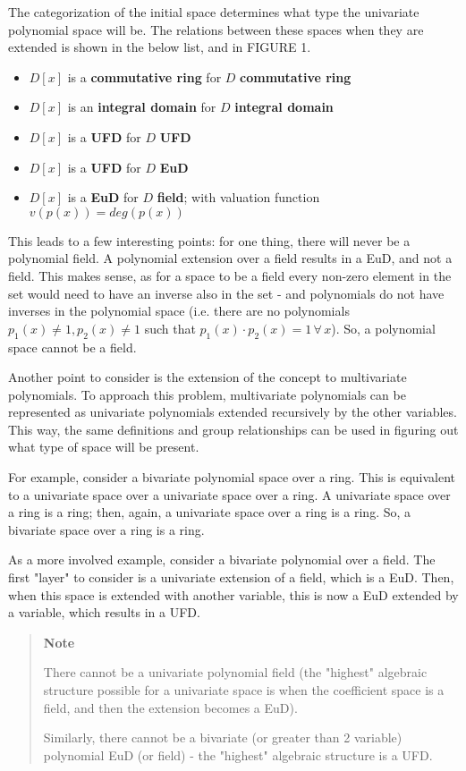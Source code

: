 \documentclass[letterpaper,12pt,titlepage,oneside,final]{book}
\newcounter{notecounter}
\newenvironment{note}{\begin{quote}%
    \refstepcounter{notecounter}%
  \textbf{Note \arabic{notecounter}}%
  \quad
}{%
\end{quote}%
}
\begin{document}
The categorization of the initial space determines what type the univariate polynomial space will be.  The relations between these spaces when they are extended is shown in the below list, and in FIGURE 1.
\begin{itemize}
	\item ${D[x]}$ is a \textbf{commutative ring} for ${D}$ \textbf{commutative ring} 
	\item ${D[x]}$ is an \textbf{integral domain} for ${D}$ \textbf{integral domain} 
	\item ${D[x]}$ is a \textbf{UFD} for ${D}$ \textbf{UFD}
	\item ${D[x]}$ is a \textbf{UFD} for ${D}$ \textbf{EuD}
	\item ${D[x]}$ is a \textbf{EuD} for ${D}$ \textbf{field}; with valuation function ${v(p(x)) = deg(p(x))}$ 
\end{itemize}  

This leads to a few interesting points: for one thing, there will never be a polynomial field.  A polynomial extension over a field results in a EuD, and not a field.  This makes sense, as for a space to be a field every non-zero element in the set would need to have an inverse also in the set - and polynomials do not have inverses in the polynomial space (i.e. there are no polynomials ${p_1(x) \neq 1, p_2(x) \neq 1}$ such that ${p_1(x) \cdot p_2(x) = 1 \, \forall \, x}$).  So, a polynomial space cannot be a field.

Another point to consider is the extension of the concept to multivariate polynomials.  To approach this problem, multivariate polynomials can be represented as univariate polynomials extended recursively by the other variables.  This way, the same definitions and group relationships can be used in figuring out what type of space will be present.  

For example, consider a bivariate polynomial space over a ring.  This is equivalent to a univariate space over a univariate space over a ring.  A univariate space over a ring is a ring; then, again, a univariate space over a ring is a ring.  So, a bivariate space over a ring is a ring.

As a more involved example, consider a bivariate polynomial over a field.  The first "layer" to consider is a univariate extension of a field, which is a EuD.  Then, when this space is extended with another variable, this is now a EuD extended by a variable, which results in a UFD.  

\begin{note}
	There cannot be a univariate polynomial field (the "highest" algebraic structure possible for a univariate space is when the coefficient space is a field, and then the extension becomes a EuD).
	
	Similarly, there cannot be a bivariate (or greater than 2 variable) polynomial EuD (or field) - the "highest" algebraic structure is a UFD.
\end{note}      
\end{document}
